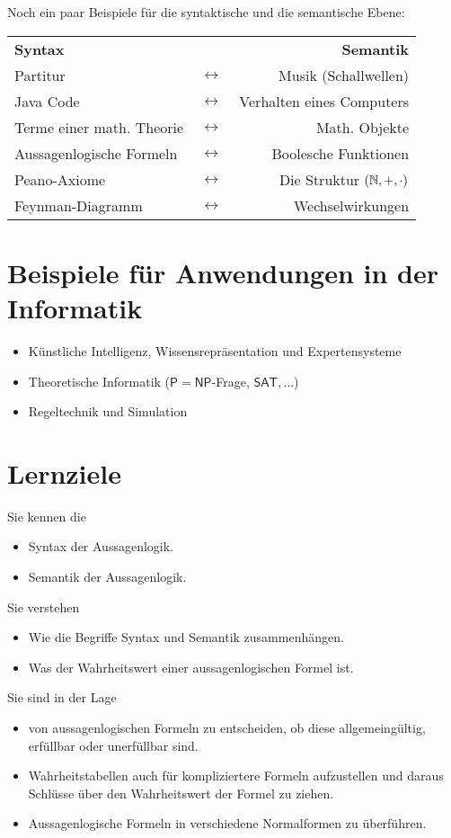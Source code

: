 Noch ein paar Beispiele für die syntaktische und die semantische Ebene:
\begin{center}
\begin{tabular}{ l c r }
\textbf{Syntax}& &\textbf{Semantik}\\
  Partitur & $\,\longleftrightarrow\,$ & Musik (Schallwellen) \\
  Java Code &  $\,\longleftrightarrow\,$ & Verhalten eines Computers \\
  Terme einer math. Theorie &  $\,\longleftrightarrow\,$ & Math. Objekte\\
  Aussagenlogische Formeln &$\,\longleftrightarrow\,$ & Boolesche Funktionen\\
 Peano-Axiome & $\,\longleftrightarrow\,$ &  Die Struktur $(\mathbb{N},+,\cdot)$\\
Feynman-Diagramm& $\,\longleftrightarrow\,$ & Wechselwirkungen
\end{tabular}
\end{center}

\section*{Beispiele für Anwendungen in der Informatik}
\begin{itemize}
\item Künstliche Intelligenz, Wissensrepräsentation und Expertensysteme
\item Theoretische Informatik ($\mathsf{P}=\mathsf{NP}$-Frage, $\mathsf{SAT},\dots$)
\item Regeltechnik und Simulation
\end{itemize}



\section*{Lernziele}
Sie kennen die
\begin{itemize}
\item Syntax der Aussagenlogik.
\item Semantik der Aussagenlogik.
\end{itemize}
Sie verstehen
\begin{itemize}
\item Wie die Begriffe Syntax und Semantik zusammenhängen.
\item Was der Wahrheitswert einer aussagenlogischen Formel ist.
\end{itemize}
Sie sind in der Lage
\begin{itemize}
\item von aussagenlogischen Formeln zu entscheiden, ob diese allgemeingültig, erfüllbar oder unerfüllbar sind.
\item Wahrheitstabellen auch für kompliziertere Formeln aufzustellen und daraus Schlüsse über den Wahrheitswert der Formel zu ziehen.
\item Aussagenlogische Formeln in verschiedene Normalformen zu überführen.
\end{itemize}


